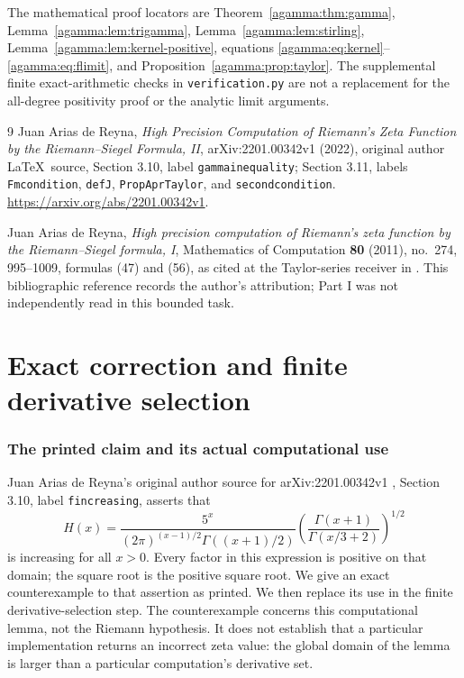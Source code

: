The mathematical proof locators are
Theorem~\ref{agamma:thm:gamma}, Lemma~\ref{agamma:lem:trigamma},
Lemma~\ref{agamma:lem:stirling}, Lemma~\ref{agamma:lem:kernel-positive},
equations \eqref{agamma:eq:kernel}--\eqref{agamma:eq:flimit}, and
Proposition~\ref{agamma:prop:taylor}. The supplemental finite exact-arithmetic
checks in \texttt{verification.py} are not a replacement for the
all-degree positivity proof or the analytic limit arguments.

\begin{thebibliography}{9}
Juan Arias de Reyna,
\emph{High Precision Computation of Riemann's Zeta Function by the
Riemann--Siegel Formula, II}, arXiv:2201.00342v1 (2022), original
author \LaTeX\ source, Section 3.10, label \texttt{gammainequality};
Section 3.11, labels \texttt{Fmcondition}, \texttt{defJ},
\texttt{PropAprTaylor}, and \texttt{secondcondition}.
\url{https://arxiv.org/abs/2201.00342v1}.

Juan Arias de Reyna,
\emph{High precision computation of Riemann's zeta function by the
Riemann--Siegel formula, I}, Mathematics of Computation
\textbf{80} (2011), no.~274, 995--1009, formulas (47) and (56),
as cited at the Taylor-series receiver in \cite{agamma:AriasII}.
This bibliographic reference records the author's attribution;
Part I was not independently read in this bounded task.
\end{thebibliography}

\endgroup

\clearpage\begingroup
\part*{Exact correction and finite derivative selection}
\newtheorem{aderivativetheorem}{Theorem}
\newtheorem{aderivativeproposition}[aderivativetheorem]{Proposition}
\newtheorem{aderivativelemma}[aderivativetheorem]{Lemma}
\newcommand{\aderivativeeps}{\varepsilon}



\section{The printed claim and its actual computational use}
\label{aderivative:sec:source}
Juan Arias de Reyna's original author source for
arXiv:2201.00342v1 \cite{aderivative:AriasII}, Section 3.10, label
\texttt{fincreasing}, asserts that
\begin{equation}\label{aderivative:eq:H}
H(x)=\frac{5^x}{(2\pi)^{(x-1)/2}\Gamma((x+1)/2)}
\left(\frac{\Gamma(x+1)}{\Gamma(x/3+2)}\right)^{1/2}
\end{equation}
is increasing for all $x>0$. Every factor in this expression is
positive on that domain; the square root is the positive square root.
We give an exact counterexample to that assertion as printed.
We then replace its use in the finite derivative-selection step.
The counterexample concerns this computational lemma, not the
Riemann hypothesis. It does not establish that a particular
implementation returns an incorrect zeta value: the global domain
of the lemma is larger than a particular computation's derivative set.

